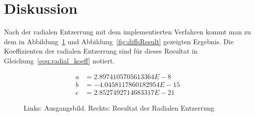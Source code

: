 
\section{Diskussion}
\label{sec:Auswertung}
Nach der radialen Entzerrung mit dem implementierten Verfahren kommt man zu dem in Abbildung~\ref{fig:Ergebnis} und Abbildung~\ref{fig:diffsResult} gezeigten Ergebnis. Die Koeffizienten der radialen Entzerrung sind für dieses Resultat in Gleichung~\ref{equ:radial_koeff} notiert. 

\begin{align}
a &=  2.8974105705613364E-8 \nonumber \\
b &= -4.0458117860182954E-15 \nonumber \\
c &=  2.8527492714683317E-21
\label{equ:radial_koeff}
\end{align}

\begin{figure}
	\caption{Links: Ausgangsbild. Rechts: Resultat der Radialen Entzerrung}
	\label{fig:Ergebnis}
\end{figure}
	
